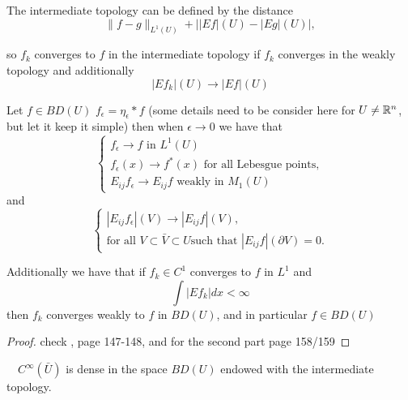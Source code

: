 \begin{definition}
The intermediate topology can be defined by the distance 
$$\|f-g\|_{L^1(U)}+\left||Ef|(U)-|Eg|(U)\right|,$$

so $f_k$ converges to $f$ in the intermediate topology if $f_k$ converges in the weakly topology and additionally
$$
|Ef_k|(U)\to |Ef|(U)
$$
\end{definition}

\begin{theorem}
 Let $f\in BD(U)$ $f_\epsilon= \eta_\epsilon * f$ (some details need to be consider here for $U\neq \R^n$, but let it keep it simple) then when $\epsilon\to 0$ we have that
$$\left\{\begin{array}{l}
f_\epsilon \rightarrow f \text { in } L^1(U) \\
f_\epsilon(x)\to f^*(x) \text{ for all Lebesgue points},\\

E_{i j}f_\epsilon\to E_{i j}f \text { weakly in } M_1(U)
\end{array}\right.
$$
and
$$
\left\{\begin{array}{l}
\left|E_{i j}f_\epsilon\right|(V)\to\left|E_{i j}f\right|(V), \\
\text{for all } V\subset\bar{V}\subset U \text{such that } |E_{i j}f|(\partial V) = 0.
\end{array}\right.$$

Additionally we have that  if $f_k\in C^1$ converges to $f$ in $L^1$ and $$\int|Ef_k|dx < \infty$$
then $f_k$ converges weakly  to $f$ in $BD(U)$, and in particular $f\in BD(U)$
\end{theorem}
\begin{proof} check \cite{RogerBook}, page 147-148, and for the second part page 158/159\end{proof}

\begin{theorem}\ \ 
$C^\infty(\bar{U})$ is dense in the space $BD(U)$ endowed with the intermediate topology.

\end{theorem}

